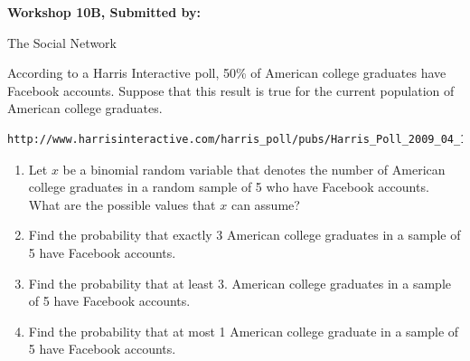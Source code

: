 \documentclass[11pt, chapterprefix=true]{scrbook}\usepackage[]{graphicx}\usepackage[]{color}
\begin{document}
\begin{exercises}
\begin{exercise}
\end{exercise}
\begin{solution}

\end{solution}


\clearpage

     \begin{exercise}  %

    \begin{center}
\begin{flushleft}\textbf{\large \hfill Workshop 10B, Submitted by: }\end{flushleft}

\end{center}

The Social Network

According to a Harris Interactive poll, 50\% of American college graduates have Facebook accounts. Suppose that this result is true for the current population of American college graduates.

\begin{verbatim}
http://www.harrisinteractive.com/harris_poll/pubs/Harris_Poll_2009_04_16.pdf
\end{verbatim}

\begin{enumerate}
  \item Let $x$ be a binomial random variable that denotes the number of American college graduates in a random sample of 5 who have Facebook accounts. What are the possible values that $x$ can assume?
  \item Find the probability that exactly 3 American college graduates in a sample of 5 have Facebook accounts.
  \item Find the probability that at least 3. American college graduates in a sample of 5 have Facebook accounts.
  \item Find the probability that at most 1 American college graduate in a sample of 5 have Facebook accounts.
\end{enumerate}


\end{exercise}
\end{exercises}
\end{document}
